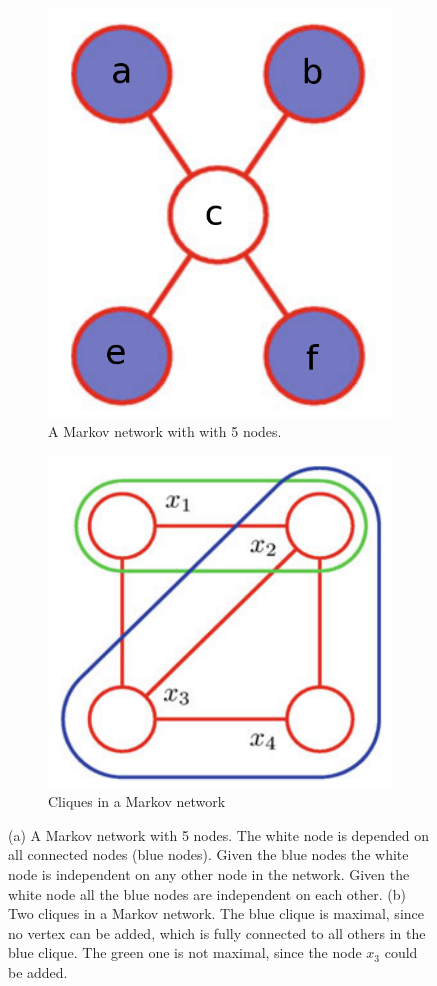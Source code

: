 \begin{figure}
	\centering
	\begin{subfigure}[t]{.5\textwidth}
  		\centering
  		\includegraphics[width=.5\linewidth]{imgs/markovnet1.png}
  		\caption{A Markov network with with 5 nodes.}
  		\label{fig:sub1}
	\end{subfigure}%
	\begin{subfigure}[t]{.5\textwidth}
  		\centering
  		\includegraphics[width=.5\linewidth]{imgs/markovnet2.png}
  		\caption{Cliques in a Markov network}
  		\label{fig:markovnet}
	\end{subfigure}
	\caption{(a) A Markov network with 5 nodes. The white node is depended on all connected nodes (blue nodes). Given the blue nodes the white node is independent on any other node in the network. Given the white node all the blue nodes are independent on each other. (b) Two cliques in a Markov network. The blue clique is maximal, since no vertex can be added, which is fully connected to all others in the blue clique. The green one is not maximal, since the node $x_3$ could be added.}
	\label{fig:test}
\end{figure}


